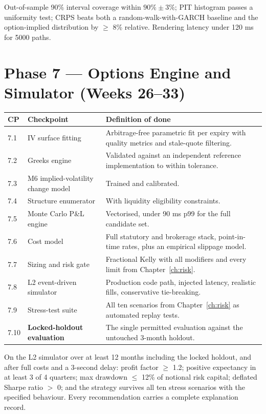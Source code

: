 \begin{gatebox}[title={Gate G6}]
Out-of-sample 90\% interval coverage within $90\% \pm 3\%$; PIT histogram passes
a uniformity test; CRPS beats both a random-walk-with-GARCH baseline and the
option-implied distribution by $\ge$ 8\% relative. Rendering latency under
120 ms for 5000 paths.
\end{gatebox}

\section{Phase 7 --- Options Engine and Simulator (Weeks 26--33)}

\begin{longtable}{@{}p{1.4cm}p{6.0cm}p{7.0cm}@{}}
\toprule
\textbf{CP} & \textbf{Checkpoint} & \textbf{Definition of done}\\
\midrule
7.1 & IV surface fitting & Arbitrage-free parametric fit per expiry with quality
metrics and stale-quote filtering.\\
7.2 & Greeks engine & Validated against an independent reference implementation
to within tolerance.\\
7.3 & M6 implied-volatility change model & Trained and calibrated.\\
7.4 & Structure enumerator & With liquidity eligibility constraints.\\
7.5 & Monte Carlo P\&L engine & Vectorised, under 90 ms p99 for the full
candidate set.\\
7.6 & Cost model & Full statutory and brokerage stack, point-in-time rates, plus
an empirical slippage model.\\
7.7 & Sizing and risk gate & Fractional Kelly with all modifiers and every limit
from Chapter~\ref{ch:risk}.\\
7.8 & L2 event-driven simulator & Production code path, injected latency,
realistic fills, conservative tie-breaking.\\
7.9 & Stress-test suite & All ten scenarios from Chapter~\ref{ch:risk} as
automated replay tests.\\
7.10 & \textbf{Locked-holdout evaluation} & The single permitted evaluation
against the untouched 3-month holdout.\\
\bottomrule
\end{longtable}

\begin{gatebox}[title={Gate G7}]
On the L2 simulator over at least 12 months including the locked holdout, and
after full costs and a 3-second delay: profit factor $\ge$ 1.2; positive
expectancy in at least 3 of 4 quarters; max drawdown $\le$ 12\% of notional
risk capital; deflated Sharpe ratio $>$ 0; and the strategy survives all ten
stress scenarios with the specified behaviour. Every recommendation carries a
complete explanation record.
\end{gatebox}

